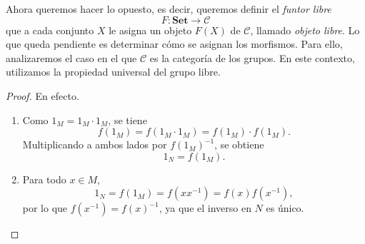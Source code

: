 \noindent Ahora queremos hacer lo opuesto, es decir, queremos definir el \textit{funtor libre} 
\[
F : \mathbf{Set} \longrightarrow \mathcal{C}
\]que a cada conjunto \(X\) le asigna un objeto \(F(X)\) de \(\mathcal{C}\), llamado \emph{objeto libre}. Lo que queda pendiente es determinar cómo se asignan los morfismos. Para ello, analizaremos el caso en el que \(\mathcal{C}\) es la categoría de los grupos. En este contexto, utilizamos la propiedad universal del grupo libre.




\begin{definicion}
\end{definicion}

\begin{proposicion}
\end{proposicion}


\begin{proof}
	En efecto.
	\begin{enumerate}
		\item Como \( 1_M = 1_M \cdot 1_M \), se tiene
		\[
		f(1_M) = f(1_M \cdot 1_M) = f(1_M) \cdot f(1_M).
		\]	Multiplicando a ambos lados por \( f(1_M)^{-1} \), se obtiene
		\[
		1_N = f(1_M).
		\]
		
		\item Para todo \( x \in M \),
		\[
		1_N = f(1_M) = f(x x^{-1}) = f(x) f(x^{-1}),
		\]
		por lo que \( f(x^{-1}) = f(x)^{-1} \), ya que el inverso en \( N \) es único.
	\end{enumerate}
\end{proof}





\begin{proposicion}
\end{proposicion}


